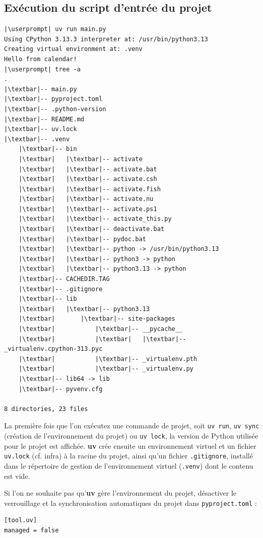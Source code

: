 \subsection*{Exécution du script d'entrée du projet}
\begin{lstlisting}[style=bash, escapeinside={||}]
|\userprompt| uv run main.py
Using CPython 3.13.3 interpreter at: /usr/bin/python3.13
Creating virtual environment at: .venv
Hello from calendar!
|\userprompt| tree -a
.
|\textbar|-- main.py
|\textbar|-- pyproject.toml
|\textbar|-- .python-version
|\textbar|-- README.md
|\textbar|-- uv.lock
|\textbar|-- .venv
    |\textbar|-- bin
    |\textbar|   |\textbar|-- activate
    |\textbar|   |\textbar|-- activate.bat
    |\textbar|   |\textbar|-- activate.csh
    |\textbar|   |\textbar|-- activate.fish
    |\textbar|   |\textbar|-- activate.nu
    |\textbar|   |\textbar|-- activate.ps1
    |\textbar|   |\textbar|-- activate_this.py
    |\textbar|   |\textbar|-- deactivate.bat
    |\textbar|   |\textbar|-- pydoc.bat
    |\textbar|   |\textbar|-- python -> /usr/bin/python3.13
    |\textbar|   |\textbar|-- python3 -> python
    |\textbar|   |\textbar|-- python3.13 -> python
    |\textbar|-- CACHEDIR.TAG
    |\textbar|-- .gitignore
    |\textbar|-- lib
    |\textbar|   |\textbar|-- python3.13
    |\textbar|       |\textbar|-- site-packages
    |\textbar|           |\textbar|-- __pycache__
    |\textbar|           |\textbar|   |\textbar|-- _virtualenv.cpython-313.pyc
    |\textbar|           |\textbar|-- _virtualenv.pth
    |\textbar|           |\textbar|-- _virtualenv.py
    |\textbar|-- lib64 -> lib
    |\textbar|-- pyvenv.cfg

8 directories, 23 files
\end{lstlisting}

La première fois que l'on exécutez une commande de projet, soit \texttt{uv run}, \texttt{uv sync} (création de l'environnement du projet) ou \texttt{uv lock}, la version de Python utilisée pour le projet est affichée. \textbf{uv} crée ensuite un environnement virtuel et un fichier \texttt{uv.lock} (cf. infra) à la racine du projet, ainsi qu'un fichier \texttt{.gitignore}, installé dans le répertoire de gestion de l'environnement virtuel (\texttt{.venv}) dont le contenu est vide. 

Si l'on ne souhaite pas qu'\textbf{uv} gère l'environnement du projet, désactiver le verrouillage et la synchronisation automatiques du projet dans \texttt{pyproject.toml} :
\begin{lstlisting}[style=file]
[tool.uv]
managed = false
\end{lstlisting}

